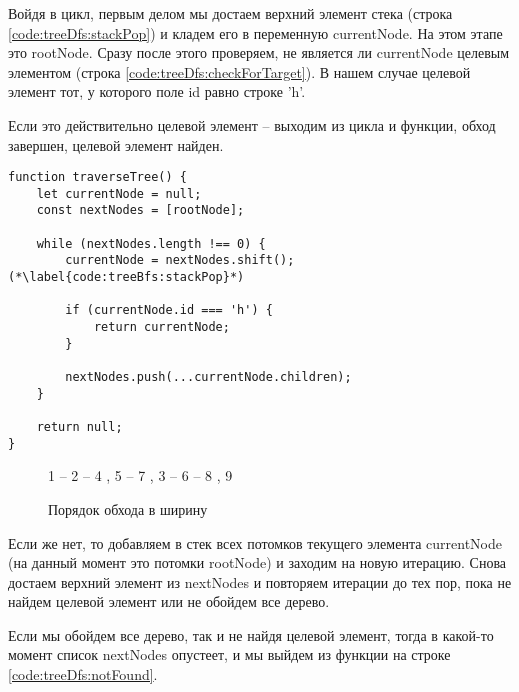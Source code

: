 \documentclass[../../article]{subfiles}
\begin{document}
Войдя в цикл, первым делом мы достаем верхний элемент стека (строка \ref{code:treeDfs:stackPop}) и кладем его в переменную {\firacodebold currentNode}. На этом этапе это {\firacodebold rootNode}. Сразу после этого проверяем, не является ли {\firacodebold currentNode} целевым элементом (строка \ref{code:treeDfs:checkForTarget}). В нашем случае целевой элемент тот, у которого поле {\firacodebold id} равно строке {\firacodebold 'h'}.

Если это действительно целевой элемент – выходим из цикла и функции, обход завершен, целевой элемент найден.

\begin{figure*}
    \begin{ruledelement}
        \begin{lstlisting}[caption={Обход дерева в ширину}, label={lst:treeBfs}]
function traverseTree() {
    let currentNode = null;
    const nextNodes = [rootNode];

    while (nextNodes.length !== 0) {
        currentNode = nextNodes.shift(); (*\label{code:treeBfs:stackPop}*)

        if (currentNode.id === 'h') {
            return currentNode;
        }

        nextNodes.push(...currentNode.children);
    }

    return null;
}

        \end{lstlisting}
    \end{ruledelement}
\end{figure*}

\begin{figure}
    \styledgraph
    {
        1 -- { 2 -- { 4 , 5 -- 7 }, 3 -- 6 -- { 8 , 9 }}
    }
    \caption{Порядок обхода в ширину}
    \label{fig:treeBfsOrder}
\end{figure}

Если же нет, то добавляем в стек всех потомков текущего элемента {\firacodebold currentNode} (на данный момент это потомки {\firacodebold rootNode}) и заходим на новую итерацию. Снова достаем верхний элемент из {\firacodebold nextNodes} и повторяем итерации до тех пор, пока не найдем целевой элемент или не обойдем все дерево.

Если мы обойдем все дерево, так и не найдя целевой элемент, тогда в какой-то момент список {\firacodebold nextNodes} опустеет, и мы выйдем из функции на строке \ref{code:treeDfs:notFound}.
\end{document}
